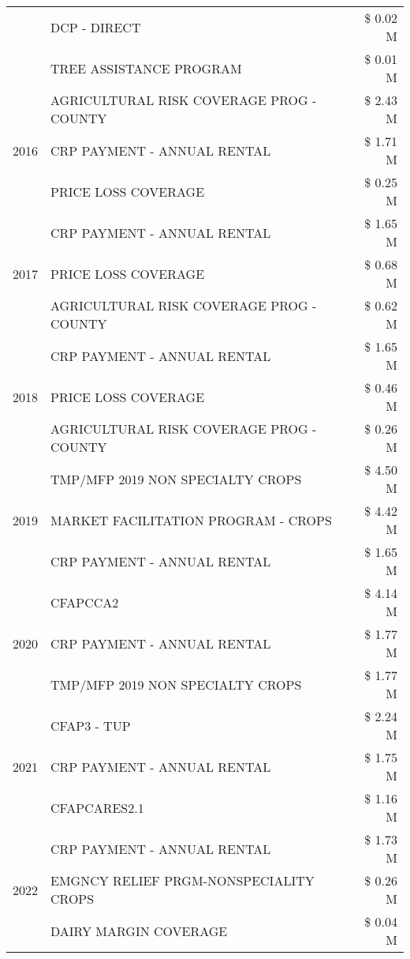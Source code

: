 \begin{tabular}{llr}
 & DCP - DIRECT & \$ 0.02 M \\
 & TREE ASSISTANCE PROGRAM & \$ 0.01 M \\
\cline{1-3}
\multirow[t]{3}{*}{2016} & AGRICULTURAL RISK COVERAGE PROG - COUNTY & \$ 2.43 M \\
 & CRP PAYMENT - ANNUAL RENTAL & \$ 1.71 M \\
 & PRICE LOSS COVERAGE & \$ 0.25 M \\
\cline{1-3}
\multirow[t]{3}{*}{2017} & CRP PAYMENT - ANNUAL RENTAL & \$ 1.65 M \\
 & PRICE LOSS COVERAGE & \$ 0.68 M \\
 & AGRICULTURAL RISK COVERAGE PROG - COUNTY & \$ 0.62 M \\
\cline{1-3}
\multirow[t]{3}{*}{2018} & CRP PAYMENT - ANNUAL RENTAL & \$ 1.65 M \\
 & PRICE LOSS COVERAGE & \$ 0.46 M \\
 & AGRICULTURAL RISK COVERAGE PROG - COUNTY & \$ 0.26 M \\
\cline{1-3}
\multirow[t]{3}{*}{2019} & TMP/MFP 2019 NON SPECIALTY CROPS & \$ 4.50 M \\
 & MARKET FACILITATION PROGRAM - CROPS & \$ 4.42 M \\
 & CRP PAYMENT - ANNUAL RENTAL & \$ 1.65 M \\
\cline{1-3}
\multirow[t]{3}{*}{2020} & CFAPCCA2 & \$ 4.14 M \\
 & CRP PAYMENT - ANNUAL RENTAL & \$ 1.77 M \\
 & TMP/MFP 2019 NON SPECIALTY CROPS & \$ 1.77 M \\
\cline{1-3}
\multirow[t]{3}{*}{2021} & CFAP3 - TUP & \$ 2.24 M \\
 & CRP PAYMENT - ANNUAL RENTAL & \$ 1.75 M \\
 & CFAPCARES2.1 & \$ 1.16 M \\
\cline{1-3}
\multirow[t]{3}{*}{2022} & CRP PAYMENT - ANNUAL RENTAL & \$ 1.73 M \\
 & EMGNCY RELIEF PRGM-NONSPECIALITY CROPS & \$ 0.26 M \\
 & DAIRY MARGIN COVERAGE & \$ 0.04 M \\
\cline{1-3}
\bottomrule
\end{tabular}
